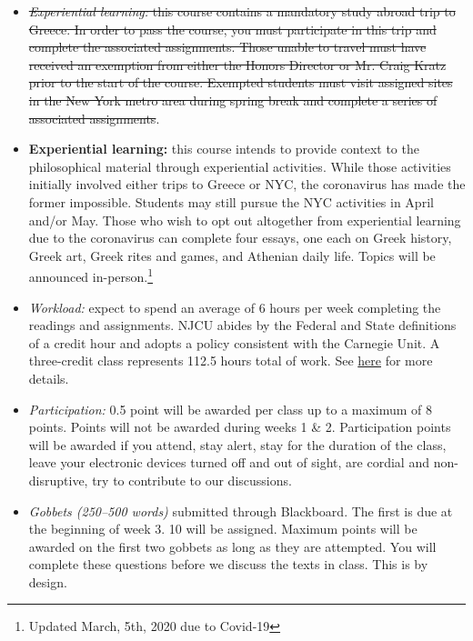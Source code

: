 \documentclass[article,oneside]{memoir}
\begin{document}
\begin{itemize}

\item \sout {\textit{Experiential learning:} this course contains a mandatory study abroad trip to Greece. In order to pass the course, you must participate in this trip and complete the associated assignments. Those unable to travel must have received an exemption from either the Honors Director or Mr. Craig Kratz prior to the start of the course. Exempted students must visit assigned sites in the New York metro area during spring break and complete a series of associated assignments}.

\item \textbf{Experiential learning:} this course intends to provide context to the philosophical material through experiential activities. While those activities initially involved either trips to Greece or NYC, the coronavirus has made the former impossible.  Students may still pursue the NYC activities in April and/or May. Those who wish to opt out altogether from experiential learning due to the coronavirus can complete four essays, one each on Greek history, Greek art, Greek rites and games, and Athenian daily life. Topics will be announced in-person.\footnote{Updated March, 5th, 2020 due to Covid-19}

\item \textit{Workload:} expect to spend an average of 6 hours per week completing the readings and assignments. NJCU abides by the Federal and State definitions of a credit hour and adopts a policy consistent with the Carnegie Unit. A three-credit class represents 112.5 hours total of work. See \href{http://scottoconnor.org/resources/Credit.pdf}{here} for more details.

\item \textit{Participation:} 0.5 point will be awarded per class up to a maximum of 8 points. Points will not be awarded during weeks 1 \& 2. Participation points will be awarded if you attend, stay alert, stay for the duration of the class, leave your electronic devices turned off and out of sight, are cordial and non-disruptive, try to contribute to our discussions. 


\item \textit{Gobbets (250--500 words)} submitted through Blackboard. The first is due at the beginning of week 3. 10 will be assigned. Maximum points will be awarded on the first two gobbets as long as they are attempted. You will complete these questions before we discuss the texts in class. This is by design. 


\end{itemize}
\end{document}
